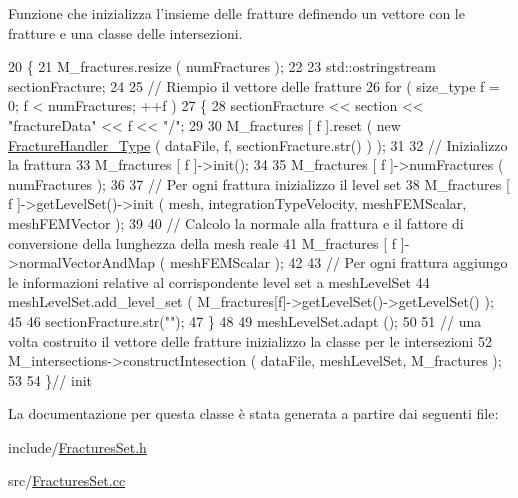 Funzione che inizializza l'insieme delle fratture definendo un vettore con le fratture e una classe delle intersezioni. 


\begin{DoxyCode}
20 \{
21         M\_fractures.resize ( numFractures );
22 
23         std::ostringstream sectionFracture;
24 
25         \textcolor{comment}{// Riempio il vettore delle fratture}
26         \textcolor{keywordflow}{for} ( size\_type f = 0; f < numFractures; ++f )
27         \{
28                 sectionFracture << section << \textcolor{stringliteral}{"fractureData"} << f << \textcolor{stringliteral}{"/"};
29 
30                 M\_fractures [ f ].reset ( \textcolor{keyword}{new} \hyperlink{classFractureHandler}{FractureHandler\_Type} ( dataFile, f, 
      sectionFracture.str() ) );
31 
32                 \textcolor{comment}{// Inizializzo la frattura  }
33                 M\_fractures [ f ]->init();
34 
35                 M\_fractures [ f ]->numFractures ( numFractures );
36 
37                 \textcolor{comment}{// Per ogni frattura inizializzo il level set}
38                 M\_fractures [ f ]->getLevelSet()->init ( mesh, integrationTypeVelocity, meshFEMScalar, 
      meshFEMVector );
39 
40                 \textcolor{comment}{// Calcolo la normale alla frattura e il fattore di conversione della lunghezza della mesh
       reale}
41                 M\_fractures [ f ]->normalVectorAndMap ( meshFEMScalar );
42 
43                 \textcolor{comment}{// Per ogni frattura aggiungo le informazioni relative al corrispondente level set a
       meshLevelSet}
44                 meshLevelSet.add\_level\_set ( M\_fractures[f]->getLevelSet()->getLevelSet() );
45 
46                 sectionFracture.str(\textcolor{stringliteral}{""});
47         \}
48 
49         meshLevelSet.adapt ();
50 
51         \textcolor{comment}{// una volta costruito il vettore delle fratture inizializzo la classe per le intersezioni}
52         M\_intersections->constructIntesection ( dataFile, meshLevelSet, M\_fractures );
53 
54 \}\textcolor{comment}{// init}
\end{DoxyCode}


La documentazione per questa classe è stata generata a partire dai seguenti file\-:\begin{DoxyCompactItemize}
\item 
include/\hyperlink{FracturesSet_8h}{Fractures\-Set.\-h}\item 
src/\hyperlink{FracturesSet_8cc}{Fractures\-Set.\-cc}\end{DoxyCompactItemize}

